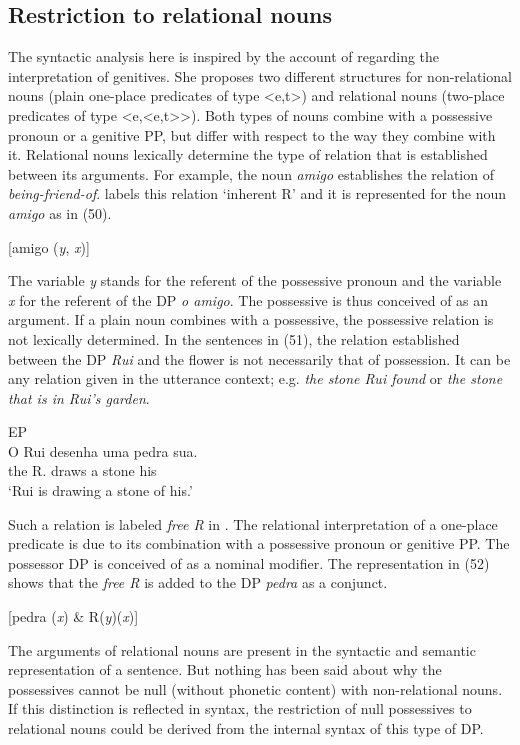 \documentclass[output=paper]{langsci/langscibook}
\begin{document}
\subsection{Restriction to relational nouns} %

The syntactic analysis here is inspired by the account of \citet{Partee1997} regarding the interpretation of genitives. She proposes two different structures for non-relational nouns (plain one-place predicates of type <e,t>) and relational nouns (two-place predicates of type <e,<e,t{>}{>}). Both types of nouns combine with a possessive pronoun or a genitive PP, but differ with respect to the way they combine with it. Relational nouns lexically determine the type of relation that is established between its arguments. For example, the noun \textit{amigo} establishes the relation of \textit{being-friend-of}. \citet{Partee1997} labels this relation ‘inherent R’ and it is represented for the noun \textit{amigo} as in (50).

\ea%
    \label{ex:wein:50}
    [amigo (\textit{y}, \textit{x})]
    \z


The variable \textit{y} stands for the referent of the possessive pronoun and the variable \textit{x} for the referent of the DP \textit{o amigo}. The possessive is thus conceived of as an argument. If a plain noun combines with a possessive, the possessive relation is not lexically determined. In the sentences in (51), the relation established between the DP \textit{Rui} and the flower is not necessarily that of possession. It can be any relation given in the utterance context; e.g. \textit{the stone Rui found} or \textit{the stone that is in Rui’s garden}.

\ea%
         EP  \label{ex:wein:51}\\
    \gll O Rui desenha uma pedra sua.\\
         the R. draws a stone his\\
    \glt ‘Rui is drawing a stone of his.’
    \z


Such a relation is labeled \textit{free R} in \citet{Partee1997}. The relational interpretation of a one-place predicate is due to its combination with a possessive pronoun or genitive PP. The possessor DP is conceived of as a nominal modifier. The representation in (52) shows that the \textit{free R} is added to the DP \textit{pedra} as a conjunct.

\ea%
    \label{ex:wein:52}
    [pedra (\textit{x}) \& R(\textit{y})(\textit{x})]
\z

The arguments of relational nouns are present in the syntactic and semantic representation of a sentence. But nothing has been said about why the possessives cannot be null (without phonetic content) with non-relational nouns. If this distinction is reflected in syntax, the restriction of null possessives to relational nouns could be derived from the internal syntax of this type of DP.
\end{document}
